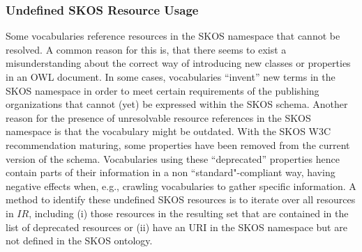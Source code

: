 \subsubsection{Undefined SKOS Resource Usage}
Some vocabularies reference resources in the SKOS namespace that cannot be resolved. A common reason for this is, that there seems to exist a misunderstanding about the correct way of introducing new classes or properties in an OWL document. In some cases, vocabularies ``invent'' new terms in the SKOS namespace in order to meet certain requirements of the publishing organizations that cannot (yet) be expressed within the SKOS schema. Another reason for the presence of unresolvable resource references in the SKOS namespace is that the vocabulary might be outdated. With the SKOS W3C recommendation maturing, some properties have been removed from the current version of the schema. Vocabularies using these ``deprecated'' properties hence contain parts of their information in a non ``standard"-compliant way, having negative effects when, e.g., crawling vocabularies to gather specific information. A method to identify these undefined SKOS resources is to iterate over all resources in $IR$, including (i) those resources in the resulting set that are contained in the list of deprecated resources or (ii) have an URI in the SKOS namespace but are not defined in the SKOS ontology. 


